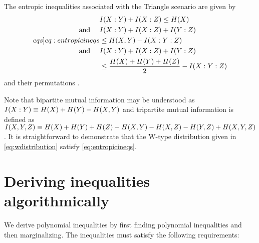 
The entropic inequalities associated with the Triangle scenario are given by 
\begin{align}\nonumber
&I\parens{X:Y}+I\parens{X:Z}\leq H\parens{X} \\\nonumber
\text{and }\quad&I\parens{X:Y}+I\parens{X:Z}+I\parens{Y:Z}\\\label[eqs]{eq:entropicineqs}
& \leq H\parens{X,Y}-I\parens{X:Y:Z}\\\nonumber
\text{and }\quad & I\parens{X:Y}+I\parens{X:Z}+I\parens{Y:Z}\\\nonumber
& \leq\frac{H\parens{X}+H\parens{Y}+H\parens{Z}}{2}-I\parens{X:Y:Z}
\end{align}
and their permutations \cite{chaves2014novel,Chaves2015infoquantum,pusey2014gdag}.

Note that bipartite mutual information may be understood as $I\lparen X:Y\rparen\equiv H\lparen X\rparen+H\lparen Y\rparen-H\lparen X,Y\rparen$ and tripartite mutual information is defined as $I\lparen X,Y,Z\rparen\equiv H\lparen X\rparen+H\lparen Y\rparen+H\lparen Z\rparen-H\lparen X,Y\rparen-H\lparen X,Z\rparen-H\lparen Y,Z\rparen+H\lparen X,Y,Z\rparen$. It is straightforward to demonstrate that the W-type distribution given in \cref{eq:wdistribution} satisfy  \cref{eq:entropicineqs}.






\section{Deriving inequalities algorithmically}
We derive polynomial inequalities by first finding  polynomial inequalities and then marginalizing. The  inequalities must satisfy the following requirements:

